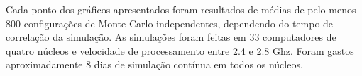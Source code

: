 Cada ponto dos gráficos apresentados foram resultados de médias de pelo
menos 800 configurações de Monte Carlo independentes, dependendo do tempo de
correlação da simulação. As simulações foram feitas em 33 computadores
de quatro núcleos e velocidade de processamento entre 2.4 e 2.8 Ghz. Foram
gastos aproximadamente 8 dias de simulação contínua em todos os núcleos.
